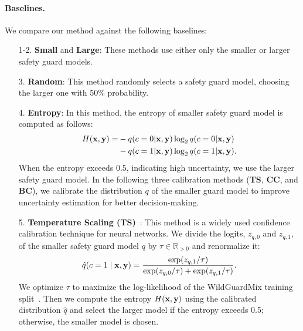\paragraph{Baselines.} We compare our method against the following baselines: 
\begin{enumerate}[leftmargin=0in, topsep=5pt, leftmargin=*]
\item[1-2.] \textbf{Small} and \textbf{Large}: These methods use either only the smaller or larger safety guard models.

\vspace{-0.05in}
\item[3.] \textbf{Random}: This method randomly selects a safety guard model, choosing the larger one with 50\% probability.


\vspace{-0.05in}
\item[4.] \textbf{Entropy}: In this method, the entropy of smaller safety guard model is computed as follows:
\begin{align*}
    \begin{split}
    H({\mathbf{x}},{\mathbf{y}})=&-q(c=0|{\mathbf{x}},{\mathbf{y}}) \log_2 q(c=0|{\mathbf{x}},{\mathbf{y}}) \\ 
    &-q(c=1|{\mathbf{x}},{\mathbf{y}}) \log_2 q(c=1|{\mathbf{x}},{\mathbf{y}}).
    \end{split}
\end{align*}
When the entropy exceeds 0.5, indicating high uncertainty, we use the larger safety guard model. In the following three calibration methods (\textbf{TS}, \textbf{CC}, and \textbf{BC}), we calibrate the distribution $q$ of the smaller guard model to improve uncertainty estimation for better decision-making.


\vspace{-0.05in}
\item[5.] \textbf{Temperature Scaling (TS)}~\cite{guo2017calibration}: This method is a widely used confidence calibration technique for neural networks. We divide the logits, $z_{q,0}$ and $z_{q,1}$, of the smaller safety guard model $q$  by $\tau\in\mathbb{R}_{>0}$ and renormalize it:
\begin{equation*}
    \hat{q}(c=1\mid {\mathbf{x}},{\mathbf{y}})= \frac{\exp(z_{q,1}/\tau)}{\exp(z_{q,0}/\tau) + \exp(z_{q,1}/\tau)}.
\end{equation*}
We optimize $\tau$ to maximize the log-likelihood of the  WildGuardMix training split~\citep{wildguard}. Then we 
compute the entropy $H({\mathbf{x}},{\mathbf{y}})$ using the calibrated distribution $\hat{q}$ and select the larger model if the entropy exceeds 0.5; otherwise, the smaller model is chosen.


\end{enumerate}
